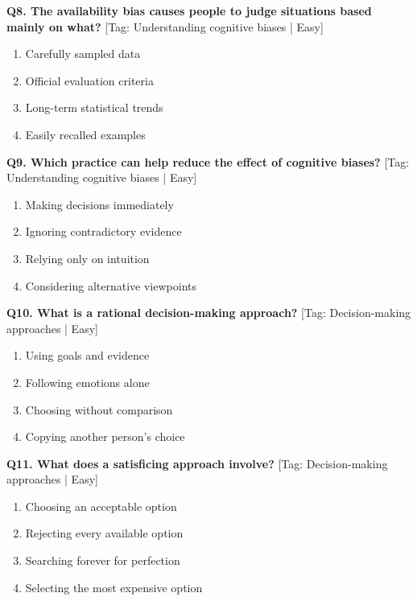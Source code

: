 \noindent\textbf{Q8. The availability bias causes people to judge situations based mainly on what?} \hfill [Tag: Understanding cognitive biases | Easy]
\begin{enumerate}[label=(\alph*),topsep=2pt,itemsep=1pt,partopsep=0pt,parsep=0pt]
    \item {Carefully sampled data}
    \item {Official evaluation criteria}
    \item {Long-term statistical trends}
    \item {Easily recalled examples}
\end{enumerate}
\vspace{2mm}

\noindent\textbf{Q9. Which practice can help reduce the effect of cognitive biases?} \hfill [Tag: Understanding cognitive biases | Easy]
\begin{enumerate}[label=(\alph*),topsep=2pt,itemsep=1pt,partopsep=0pt,parsep=0pt]
    \item {Making decisions immediately}
    \item {Ignoring contradictory evidence}
    \item {Relying only on intuition}
    \item {Considering alternative viewpoints}
\end{enumerate}
\vspace{2mm}

\noindent\textbf{Q10. What is a rational decision-making approach?} \hfill [Tag: Decision-making approaches | Easy]
\begin{enumerate}[label=(\alph*),topsep=2pt,itemsep=1pt,partopsep=0pt,parsep=0pt]
    \item {Using goals and evidence}
    \item {Following emotions alone}
    \item {Choosing without comparison}
    \item {Copying another person's choice}
\end{enumerate}
\vspace{2mm}

\noindent\textbf{Q11. What does a satisficing approach involve?} \hfill [Tag: Decision-making approaches | Easy]
\begin{enumerate}[label=(\alph*),topsep=2pt,itemsep=1pt,partopsep=0pt,parsep=0pt]
    \item {Choosing an acceptable option}
    \item {Rejecting every available option}
    \item {Searching forever for perfection}
    \item {Selecting the most expensive option}
\end{enumerate}
\vspace{2mm}

